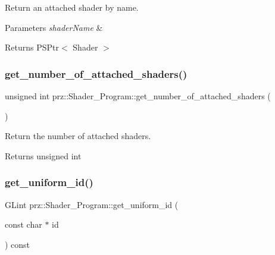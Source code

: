 Return an attached shader by name. 


\begin{DoxyParams}{Parameters}
{\em shader\+Name} & \\
\hline
\end{DoxyParams}
\begin{DoxyReturn}{Returns}
P\+S\+Ptr$<$ Shader $>$ 
\end{DoxyReturn}
\mbox{\label{classprz_1_1_shader___program_a9259f0edb13c9d2dd8b9863c668d0434}} 
\subsubsection{\texorpdfstring{get\_number\_of\_attached\_shaders()}{get\_number\_of\_attached\_shaders()}}
{\footnotesize\ttfamily unsigned int prz\+::\+Shader\+\_\+\+Program\+::get\+\_\+number\+\_\+of\+\_\+attached\+\_\+shaders (\begin{DoxyParamCaption}{ }\end{DoxyParamCaption})\hspace{0.3cm}{\ttfamily [inline]}}



Return the number of attached shaders. 

\begin{DoxyReturn}{Returns}
unsigned int 
\end{DoxyReturn}
\mbox{\label{classprz_1_1_shader___program_afe3de8262b16d85fe6e11519398c6dc9}} 
\subsubsection{\texorpdfstring{get\_uniform\_id()}{get\_uniform\_id()}}
{\footnotesize\ttfamily G\+Lint prz\+::\+Shader\+\_\+\+Program\+::get\+\_\+uniform\+\_\+id (\begin{DoxyParamCaption}\item[{const char $\ast$}]{id }\end{DoxyParamCaption}) const\hspace{0.3cm}{\ttfamily [inline]}}



